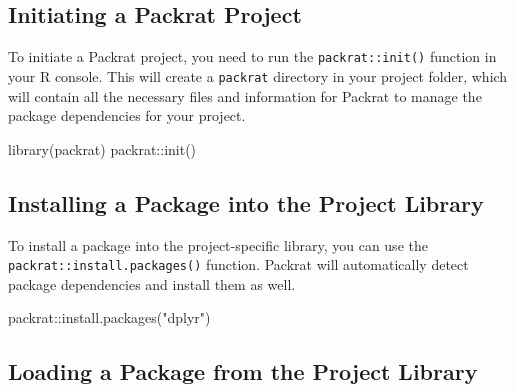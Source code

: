 \documentclass[
]{book}
\newenvironment{Shaded}{\begin{snugshade}}{\end{snugshade}}
\newcommand{\FunctionTok}[1]{\textcolor[rgb]{0.00,0.00,0.00}{#1}}
\newcommand{\NormalTok}[1]{#1}
\newcommand{\SpecialCharTok}[1]{\textcolor[rgb]{0.00,0.00,0.00}{#1}}
\newcommand{\StringTok}[1]{\textcolor[rgb]{0.31,0.60,0.02}{#1}}
\begin{document}
\hypertarget{initiating-a-packrat-project}{%
\subsection*{Initiating a Packrat Project}\label{initiating-a-packrat-project}}

To initiate a Packrat project, you need to run the \texttt{packrat::init()} function in your R console. This will create a \texttt{packrat} directory in your project folder, which will contain all the necessary files and information for Packrat to manage the package dependencies for your project.

\begin{Shaded}
\begin{Highlighting}[]
\FunctionTok{library}\NormalTok{(packrat)}
\NormalTok{packrat}\SpecialCharTok{::}\FunctionTok{init}\NormalTok{()}
\end{Highlighting}
\end{Shaded}

\hypertarget{installing-a-package-into-the-project-library}{%
\subsection*{Installing a Package into the Project Library}\label{installing-a-package-into-the-project-library}}

To install a package into the project-specific library, you can use the \texttt{packrat::install.packages()} function. Packrat will automatically detect package dependencies and install them as well.

\begin{Shaded}
\begin{Highlighting}[]
\NormalTok{packrat}\SpecialCharTok{::}\FunctionTok{install.packages}\NormalTok{(}\StringTok{"dplyr"}\NormalTok{)}
\end{Highlighting}
\end{Shaded}

\hypertarget{loading-a-package-from-the-project-library}{%
\subsection*{Loading a Package from the Project Library}\label{loading-a-package-from-the-project-library}}
\end{document}
